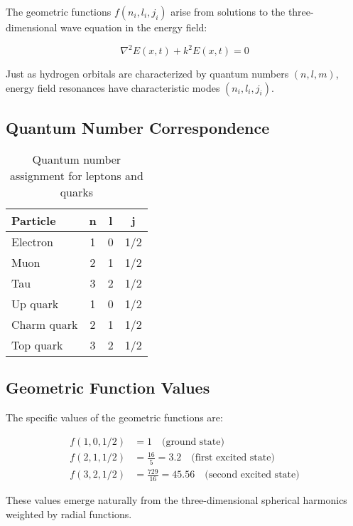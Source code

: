 \documentclass[12pt,a4paper]{report}
\newcommand{\Efield}{E(x,t)}              %
\begin{document}
The geometric functions $f(n_i, l_i, j_i)$ arise from solutions to the three-dimensional wave equation in the energy field:

\begin{equation}
	\nabla^2 \Efield + k^2 \Efield = 0
\end{equation}

Just as hydrogen orbitals are characterized by quantum numbers $(n, l, m)$, energy field resonances have characteristic modes $(n_i, l_i, j_i)$.

\subsection{Quantum Number Correspondence}
\label{subsec:quantum_number_correspondence}

\begin{table}[htbp]
	\centering
	\begin{tabular}{lccc}
		\toprule
		\textbf{Particle} & \textbf{n} & \textbf{l} & \textbf{j} \\
		\midrule
		Electron & 1 & 0 & 1/2 \\
		Muon & 2 & 1 & 1/2 \\
		Tau & 3 & 2 & 1/2 \\
		\midrule
		Up quark & 1 & 0 & 1/2 \\
		Charm quark & 2 & 1 & 1/2 \\
		Top quark & 3 & 2 & 1/2 \\
		\bottomrule
	\end{tabular}
	\caption{Quantum number assignment for leptons and quarks}
	\label{tab:quantum_numbers}
\end{table}

\subsection{Geometric Function Values}
\label{subsec:geometric_function_values}

The specific values of the geometric functions are:

\begin{align}
	f(1,0,1/2) &= 1 \quad \text{(ground state)} \\
	f(2,1,1/2) &= \frac{16}{5} = 3.2 \quad \text{(first excited state)} \\
	f(3,2,1/2) &= \frac{729}{16} = 45.56 \quad \text{(second excited state)}
\end{align}

These values emerge naturally from the three-dimensional spherical harmonics weighted by radial functions.
\end{document}
